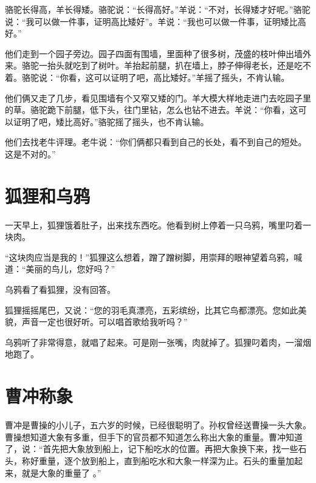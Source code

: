 \documentclass[12pt,UTF-8,openany]{ctexbook}
\begin{document}
\begin{large}
    
    骆驼长得高，羊长得矮。骆驼说：“长得高好。”羊说：“不对，长得矮才好呢。”骆驼说：“我可以做一件事，证明高比矮好”。羊说：“我也可以做一件事，证明矮比高好。”
    
    他们走到一个园子旁边。园子四面有围墙，里面种了很多树，茂盛的枝叶伸出墙外来。骆驼一抬头就吃到了树叶。羊抬起前腿，扒在墙上，脖子伸得老长，还是吃不着。骆驼说：“你看，这可以证明了吧，高比矮好。”羊摇了摇头，不肯认输。
    
    他们俩又走了几步，看见围墙有个又窄又矮的门。羊大模大样地走进门去吃园子里的草。骆驼跪下前腿，低下头，往门里钻，怎么也钻不进去。羊说：“你看，这可以证明了吧，矮比高好。”骆驼摇了摇头，也不肯认输。
    
    他们去找老牛评理。老牛说：“你们俩都只看到自己的长处，看不到自己的短处。这是不对的。”
    
\end{large}



\chapter{狐狸和乌鸦}

\begin{large}
    
    一天早上，狐狸饿着肚子，出来找东西吃。他看到树上停着一只乌鸦，嘴里叼着一块肉。
    
    “这块肉应当是我的！”狐狸这么想着，蹭了蹭树脚，用崇拜的眼神望着乌鸦，喊道：“美丽的鸟儿，您好吗？”
    
    乌鸦看了看狐狸，没有回答。
    
    狐狸摇摇尾巴，又说：“您的羽毛真漂亮，五彩缤纷，比其它鸟都漂亮。您如此美貌，声音一定也很好听。可以唱首歌给我听吗？”
    
    乌鸦听了非常得意，就唱了起来。可是刚一张嘴，肉就掉了。狐狸叼着肉，一溜烟地跑了。
    
\end{large}



\chapter{曹冲称象}

\begin{large}
    
    曹冲是曹操的小儿子，五六岁的时候，已经很聪明了。孙权曾经送曹操一头大象。曹操想知道大象有多重，但手下的官员都不知道怎么称出大象的重量。曹冲知道了，说：“首先把大象放到船上，记下船吃水的位置。再把大象换下来，找一些石头，称好重量，逐个放到船上，直到船吃水和大象一样深为止。石头的重量加起来，就是大象的重量了  。”
    
\end{large}
\end{document}
